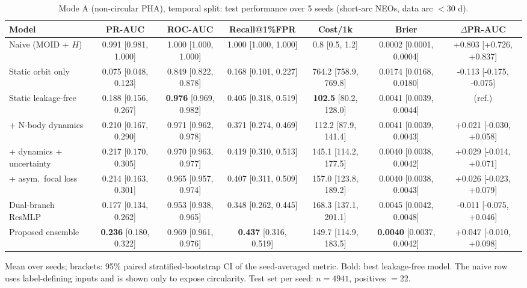 \begin{table}[t]
\centering
\small
\caption{Mode A (non-circular PHA), temporal split: test performance over 5 seeds (short-arc NEOs, data arc $<30$ d).}
\label{tab:pha_temporal_short_arc}
\begin{tabular}{lcccccc}
\toprule
Model & PR-AUC & ROC-AUC & Recall@1\%FPR & Cost/1k & Brier & $\Delta$PR-AUC \\
\midrule
Naive (MOID + $H$) & 0.991 \scriptsize{[0.981, 1.000]} & 1.000 \scriptsize{[1.000, 1.000]} & 1.000 \scriptsize{[1.000, 1.000]} & 0.8 \scriptsize{[0.5, 1.2]} & 0.0002 \scriptsize{[0.0001, 0.0004]} & +0.803 \scriptsize{[+0.726, +0.837]} \\
\midrule
Static orbit only & 0.075 \scriptsize{[0.048, 0.123]} & 0.849 \scriptsize{[0.822, 0.878]} & 0.168 \scriptsize{[0.101, 0.227]} & 764.2 \scriptsize{[758.9, 769.8]} & 0.0174 \scriptsize{[0.0168, 0.0180]} & -0.113 \scriptsize{[-0.175, -0.075]} \\
Static leakage-free & 0.188 \scriptsize{[0.156, 0.267]} & \textbf{0.976} \scriptsize{[0.969, 0.982]} & 0.405 \scriptsize{[0.318, 0.519]} & \textbf{102.5} \scriptsize{[80.2, 128.0]} & 0.0041 \scriptsize{[0.0039, 0.0044]} & (ref.) \\
+ N-body dynamics & 0.210 \scriptsize{[0.167, 0.290]} & 0.971 \scriptsize{[0.962, 0.978]} & 0.371 \scriptsize{[0.274, 0.469]} & 112.2 \scriptsize{[87.9, 141.4]} & 0.0041 \scriptsize{[0.0039, 0.0043]} & +0.021 \scriptsize{[-0.030, +0.058]} \\
+ dynamics + uncertainty & 0.217 \scriptsize{[0.170, 0.305]} & 0.970 \scriptsize{[0.963, 0.977]} & 0.419 \scriptsize{[0.310, 0.513]} & 145.1 \scriptsize{[114.2, 177.5]} & 0.0040 \scriptsize{[0.0038, 0.0042]} & +0.029 \scriptsize{[-0.014, +0.071]} \\
+ asym.\ focal loss & 0.214 \scriptsize{[0.163, 0.301]} & 0.965 \scriptsize{[0.957, 0.974]} & 0.407 \scriptsize{[0.311, 0.509]} & 157.0 \scriptsize{[123.8, 189.2]} & 0.0040 \scriptsize{[0.0038, 0.0043]} & +0.026 \scriptsize{[-0.023, +0.079]} \\
Dual-branch ResMLP & 0.177 \scriptsize{[0.134, 0.262]} & 0.953 \scriptsize{[0.938, 0.965]} & 0.348 \scriptsize{[0.262, 0.445]} & 168.3 \scriptsize{[137.1, 201.1]} & 0.0045 \scriptsize{[0.0042, 0.0048]} & -0.011 \scriptsize{[-0.075, +0.046]} \\
Proposed ensemble & \textbf{0.236} \scriptsize{[0.180, 0.322]} & 0.969 \scriptsize{[0.961, 0.976]} & \textbf{0.437} \scriptsize{[0.316, 0.519]} & 149.7 \scriptsize{[114.9, 183.5]} & \textbf{0.0040} \scriptsize{[0.0037, 0.0042]} & +0.047 \scriptsize{[-0.010, +0.098]} \\
\bottomrule
\end{tabular}
\par\vspace{2pt}\footnotesize Mean over seeds; brackets: 95\% paired stratified-bootstrap CI of the seed-averaged metric. Bold: best leakage-free model. The naive row uses label-defining inputs and is shown only to expose circularity. Test set per seed: $n=4941$, positives $=22$.
\end{table}
